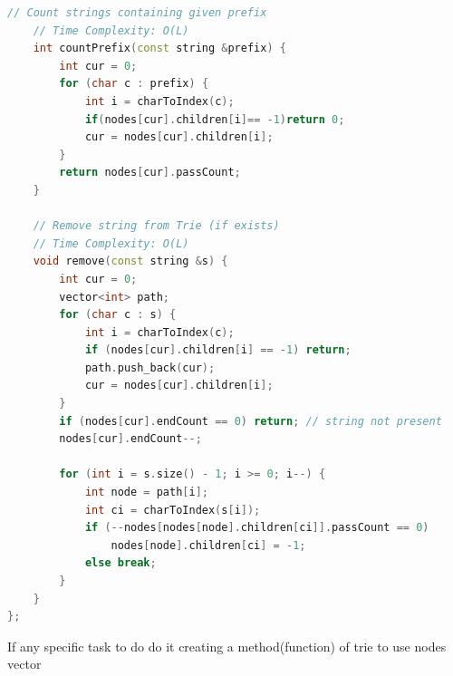 \begin{lstlisting}[language=C++]
    // Count strings containing given prefix
    // Time Complexity: O(L)
    int countPrefix(const string &prefix) {
        int cur = 0;
        for (char c : prefix) {
            int i = charToIndex(c);
            if(nodes[cur].children[i]== -1)return 0;
            cur = nodes[cur].children[i];
        }
        return nodes[cur].passCount;
    }

    // Remove string from Trie (if exists)
    // Time Complexity: O(L)
    void remove(const string &s) {
        int cur = 0;
        vector<int> path;
        for (char c : s) {
            int i = charToIndex(c);
            if (nodes[cur].children[i] == -1) return;
            path.push_back(cur);
            cur = nodes[cur].children[i];
        }
        if (nodes[cur].endCount == 0) return; // string not present
        nodes[cur].endCount--;

        for (int i = s.size() - 1; i >= 0; i--) {
            int node = path[i];
            int ci = charToIndex(s[i]);
            if (--nodes[nodes[node].children[ci]].passCount == 0)
                nodes[node].children[ci] = -1;
            else break;
        }
    }
};
\end{lstlisting}

If any specific task to do do it creating a method(function) of trie to use nodes vector

